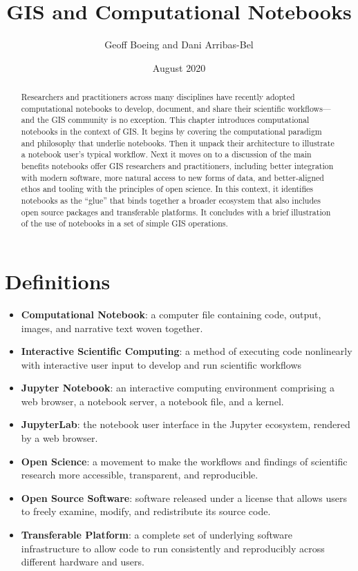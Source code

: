 \documentclass[11pt,letterpaper]{article}
\title{GIS and Computational Notebooks}
\author{Geoff Boeing and Dani Arribas-Bel}
\date{August 2020}
\begin{document}
\maketitle

\begin{abstract}
Researchers and practitioners across many disciplines have recently adopted computational notebooks to develop, document, and share their scientific workflows---and the GIS community is no exception. This chapter introduces computational notebooks in the context of GIS. It begins by covering the computational paradigm and philosophy that underlie notebooks. Then it unpack their architecture to illustrate a notebook user's typical workflow. Next it moves on to a discussion of the main benefits notebooks offer GIS researchers and practitioners, including better integration with modern software, more natural access to new forms of data, and better-aligned ethos and tooling with the principles of open science. In this context, it identifies notebooks as the \enquote{glue} that binds together a broader ecosystem that also includes open source packages and transferable platforms. It concludes with a brief illustration of the use of notebooks in a set of simple GIS operations.
\end{abstract}

\section*{Definitions}

\begin{itemize}
    \item \textbf{Computational Notebook}: a computer file containing code, output, images, and narrative text woven together.
    \item \textbf{Interactive Scientific Computing}: a method of executing code nonlinearly with interactive user input to develop and run scientific workflows
    \item \textbf{Jupyter Notebook}: an interactive computing environment comprising a web browser, a notebook server, a notebook file, and a kernel.
    \item \textbf{JupyterLab}: the notebook user interface in the Jupyter ecosystem, rendered by a web browser.
    \item \textbf{Open Science}: a movement to make the workflows and findings of scientific research more accessible, transparent, and reproducible.
    \item \textbf{Open Source Software}: software released under a license that allows users to freely examine, modify, and redistribute its source code.
    \item \textbf{Transferable Platform}: a complete set of underlying software infrastructure to allow code to run consistently and reproducibly across different hardware and users.
\end{itemize}
\end{document}
